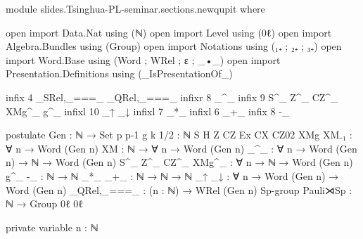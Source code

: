 \begin{code}[hide]
module slides.Tsinghua-PL-seminar.sections.newqupit where

open import Data.Nat using (ℕ)
open import Level using (0ℓ)
open import Algebra.Bundles using (Group)
open import Notations using (₁₊ ; ₂₊ ; ₃₊)
open import Word.Base using (Word ; WRel ; ε ; _•_)
open import Presentation.Definitions using (_IsPresentationOf_)

infix 4 _SRel,_===_ _QRel,_===_
infixr 8 _^_
infix 9 S^_ Z^_ CZ^_ XMg^_ g^_
infixl 10 _↑ _↓
infixl 7 _*_
infixl 6 _+_
infix 8 -_

postulate
  Gen : ℕ → Set
  p p-1 g k 1/2 : ℕ
  S H Z CZ Ex CX CZ02 XMg XM₋₁ : ∀ {n} → Word (Gen n)
  XM : ℕ → ∀ {n} → Word (Gen n)
  _^_ : ∀ {n} → Word (Gen n) → ℕ → Word (Gen n)
  S^_ Z^_ CZ^_ XMg^_ : ∀ {n} → ℕ → Word (Gen n)
  g^_ -_ : ℕ → ℕ
  _*_ _+_ : ℕ → ℕ → ℕ
  _↑ _↓ : ∀ {n} → Word (Gen n) → Word (Gen n)
  _QRel,_===_ : (n : ℕ) → WRel (Gen n)
  Sp-group Pauli⋊Sp : ℕ → Group 0ℓ 0ℓ

private variable
  n : ℕ
\end{code}

